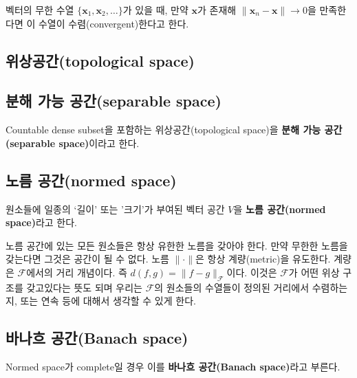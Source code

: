 \documentclass[b5paper,]{scrbook}
\theoremstyle{plain}
\theoremstyle{definition}
\numberwithin{equation}{section}
\let\BeginKnitrBlock\begin \let\EndKnitrBlock\end
\begin{document}
\BeginKnitrBlock{definition}[코시 수열의 수렴]
\protect\hypertarget{def:unnamed-chunk-12}{}{\label{def:unnamed-chunk-12}
{} }벡터의 무한 수열
\(\{\mathbf{x}_{1},\mathbf{x}_{2}, \ldots \}\)가 있을 때, 만약
\(\mathbf{x}\)가 존재해
\(\| \mathbf{x}_{n} -\mathbf{x}\|\rightarrow 0\)을 만족한다면 이 수열이
수렴(convergent)한다고 한다.
\EndKnitrBlock{definition}

\subsection{위상공간(topological space)}\label{topological-space}

\subsection{분해 가능 공간(separable space)}\label{--separable-space}

Countable dense subset을 포함하는 위상공간(topological space)을
\textbf{분해 가능 공간(separable space)}이라고 한다.

\subsection{노름 공간(normed space)}\label{-normed-space}

\BeginKnitrBlock{definition}[노름 공간]
\protect\hypertarget{def:unnamed-chunk-13}{}{\label{def:unnamed-chunk-13}
{} }원소들에 일종의 `길이' 또는 '크기'가 부여된
벡터 공간 \(V\)을 \textbf{노름 공간(normed space)}라고 한다.
\EndKnitrBlock{definition}

노름 공간에 있는 모든 원소들은 항상 유한한 노름을 갖아야 한다. 만약
무한한 노름을 갖는다면 그것은 공간이 될 수 없다. 노름 \(\|\cdot\|\)은
항상 계량(metric)을 유도한다. 계량은 \(\mathcal{F}\)에서의 거리
개념이다. 즉 \(d(f,g)=\| f-g\|_{\mathcal{F}}\)이다. 이것은
\(\mathcal{F}\)가 어떤 위상 구조를 갖고있다는 뜻도 되며 우리는
\(\mathcal{F}\)의 원소들의 수열들이 정의된 거리에서 수렴하는지, 또는
연속 등에 대해서 생각할 수 있게 한다.

\subsection{바나흐 공간(Banach space)}\label{-banach-space}

\BeginKnitrBlock{definition}[힐버트 공간]
\protect\hypertarget{def:unnamed-chunk-14}{}{\label{def:unnamed-chunk-14}
{} }Normed space가 complete일 경우 이를
\textbf{바나흐 공간(Banach space)}라고 부른다.
\EndKnitrBlock{definition}
\end{document}

